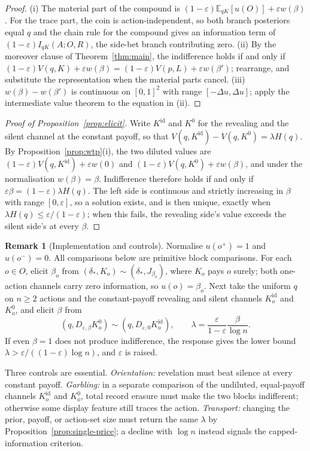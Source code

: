 \documentclass[11pt,a4paper]{article}
\theoremstyle{definition}
\newtheorem{remark}[theorem]{Remark}
\newcommand{\E}{\mathbb E}
\newcommand{\I}{I}
\newcommand{\Sh}{H}
\newcommand{\1}{\mathbf 1}
\begin{document}
\begin{proof}
(i) The material part of the compound is $(1-\varepsilon)\E_{qK}[u(O)]+\varepsilon w(\beta)$.  For the trace part,
the coin is action-independent, so both branch posteriors equal $q$ and the chain rule for the compound gives an
information term of $(1-\varepsilon)\I_{qK}(A;O,R)$, the side-bet branch contributing zero.
(ii) By the moreover clause of Theorem~\ref{thm:main}, the indifference holds if and only if
$(1-\varepsilon)V(q,K)+\varepsilon w(\beta)=(1-\varepsilon)V(p,L)+\varepsilon w(\beta')$; rearrange, and
substitute the representation when the material parts cancel.
(iii) $w(\beta)-w(\beta')$ is continuous on $[0,1]^2$ with range $[-\Delta u,\Delta u]$; apply the intermediate
value theorem to the equation in \textup{(ii)}.
\end{proof}

\begin{proof}[Proof of Proposition~\ref{prop:elicit}]
Write $K^{\mathrm{id}}$ and $K^{0}$ for the revealing and the silent channel at the constant payoff, so that
$V(q,K^{\mathrm{id}})-V(q,K^{0})=\lambda\Sh(q)$.  By Proposition~\ref{prop:wtp}\textup{(i)}, the two diluted
values are $(1-\varepsilon)V(q,K^{\mathrm{id}})+\varepsilon w(0)$ and
$(1-\varepsilon)V(q,K^{0})+\varepsilon w(\beta)$, and under the normalisation $w(\beta)=\beta$.  Indifference
therefore holds if and only if $\varepsilon\beta=(1-\varepsilon)\lambda\Sh(q)$.  The left side is continuous and
strictly increasing in $\beta$ with range $[0,\varepsilon]$, so a solution exists, and is then unique, exactly
when $\lambda\Sh(q)\le\varepsilon/(1-\varepsilon)$; when this fails, the revealing side's value exceeds the
silent side's at every $\beta$.
\end{proof}

\begin{remark}[Implementation and controls]\label{rem:elicitation}
Normalise $u(o^+)=1$ and $u(o^-)=0$.  All comparisons below are primitive
block comparisons.  For each $o\in O$, elicit $\beta_o$ from
$(\delta_\ast,K_o)\sim(\delta_\ast,J_{\beta_o})$, where $K_o$ pays $o$
surely; both one-action channels carry zero information, so
$u(o)=\beta_o$.  Next take the uniform $q$ on $n\ge2$ actions and the
constant-payoff revealing and silent channels $K_o^{\mathrm{id}}$ and
$K_o^0$, and elicit $\beta$ from
\[
 (q,D_{\varepsilon,\beta}K_o^0)
 \sim(q,D_{\varepsilon,0}K_o^{\mathrm{id}}),
 \qquad
 \lambda=\frac{\varepsilon}{1-\varepsilon}\frac{\beta}{\log n}.
\]
If even $\beta=1$ does not produce indifference, the response gives the lower bound
$\lambda>\varepsilon/((1-\varepsilon)\log n)$, and $\varepsilon$ is raised.

Three controls are essential.  \emph{Orientation:} revelation must beat
silence at every constant payoff.  \emph{Garbling:} in a separate comparison of the undiluted,
equal-payoff channels $K_o^{\mathrm{id}}$ and $K_o^0$, total record
erasure must make the two blocks indifferent; otherwise some display feature
still traces the action.  \emph{Transport:} changing the prior, payoff, or
action-set size must return the same $\lambda$ by
Proposition~\ref{prop:single-price}; a decline with $\log n$ instead signals
the capped-information criterion.
\end{remark}
\end{document}
